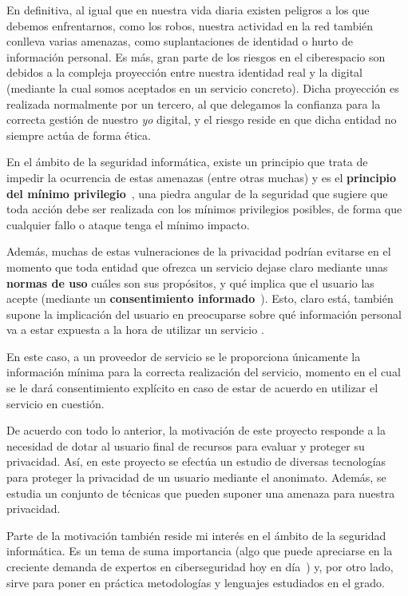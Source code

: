 En definitiva, al igual que en nuestra vida diaria existen peligros a
los que debemos enfrentarnos, como los robos, nuestra actividad en la
red también conlleva varias amenazas, como suplantaciones de identidad
o hurto de información personal. Es más, gran parte de los riesgos en
el ciberespacio son debidos a la compleja proyección entre nuestra
identidad real y la digital (mediante la cual somos aceptados en un
servicio concreto). Dicha proyección es realizada normalmente por un
tercero, al que delegamos la confianza para la correcta gestión de
nuestro \textit{yo} digital, y el riesgo reside en que dicha entidad
no siempre actúa de forma ética.

En el ámbito de la seguridad informática, existe un principio que
trata de impedir la ocurrencia de estas amenazas (entre otras muchas)
y es el \textbf{principio del mínimo
  privilegio}~\cite{schneider2003least}, una piedra angular de la
seguridad que sugiere que toda acción debe ser realizada con los
mínimos privilegios posibles, de forma que cualquier fallo o ataque
tenga el mínimo impacto.

Además, muchas de estas vulneraciones de la privacidad podrían
evitarse en el momento que toda entidad que ofrezca un servicio dejase
claro mediante unas \textbf{normas de uso} cuáles son sus propósitos,
y qué implica que el usuario las acepte (mediante un
\textbf{consentimiento informado}~\cite{lane2014privacy}). Esto,
claro está, también supone la implicación del usuario en preocuparse
sobre qué información personal va a estar expuesta a la hora de
utilizar un servicio \cite{sanchez2018review}.

En este caso, a un proveedor de servicio se le proporciona únicamente la información mínima para la correcta realización del servicio, momento en el cual se le dará consentimiento explícito en caso de estar de acuerdo en utilizar el servicio en cuestión. 

De acuerdo con todo lo anterior, la motivación de este proyecto
responde a la necesidad de dotar al usuario final de recursos para
evaluar y proteger su privacidad. Así, en este proyecto se efectúa un
estudio de diversas tecnologías para proteger la privacidad de un
usuario mediante el anonimato. Además, se estudia un conjunto de
técnicas que pueden suponer una amenaza para nuestra privacidad.
 
Parte de la motivación también reside mi interés en el ámbito de la
seguridad informática. Es un tema de suma importancia (algo que puede
apreciarse en la creciente demanda de expertos en ciberseguridad hoy
en día~\cite{article:expCiberseguridad}) y, por otro lado, sirve para
poner en práctica metodologías y lenguajes estudiados en el grado.


